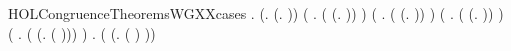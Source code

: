\begin{SaveVerbatim}{HOLCongruenceTheoremsWGXXcases}
\HOLTokenTurnstile{} \HOLSymConst{\HOLTokenForall{}}.
         \HOLSymConst{\HOLTokenEquiv{}}
       (\HOLSymConst{\HOLTokenExists{}}.  \HOLSymConst{=} (\HOLTokenLambda{}. )) \HOLSymConst{\HOLTokenDisj{}}
       (\HOLSymConst{\HOLTokenExists{}} . ( \HOLSymConst{=} (\HOLTokenLambda{}.  )) \HOLSymConst{\HOLTokenConj{}}  ) \HOLSymConst{\HOLTokenDisj{}}
       (\HOLSymConst{\HOLTokenExists{}} . ( \HOLSymConst{=} (\HOLTokenLambda{}.   \HOLSymConst{\ensuremath{+}}  )) \HOLSymConst{\HOLTokenConj{}}   \HOLSymConst{\HOLTokenConj{}}  ) \HOLSymConst{\HOLTokenDisj{}}
       (\HOLSymConst{\HOLTokenExists{}} . ( \HOLSymConst{=} (\HOLTokenLambda{}.   \HOLSymConst{\ensuremath{\parallel}}  )) \HOLSymConst{\HOLTokenConj{}}   \HOLSymConst{\HOLTokenConj{}}  ) \HOLSymConst{\HOLTokenDisj{}}
       (\HOLSymConst{\HOLTokenExists{}} . ( \HOLSymConst{=} (\HOLTokenLambda{}. \HOLConst{\ensuremath{\nu}}  ( ))) \HOLSymConst{\HOLTokenConj{}}  ) \HOLSymConst{\HOLTokenDisj{}}
       \HOLSymConst{\HOLTokenExists{}} . ( \HOLSymConst{=} (\HOLTokenLambda{}.  ( ) )) \HOLSymConst{\HOLTokenConj{}}  
\end{SaveVerbatim}
\newcommand{\HOLCongruenceTheoremsWGXXcases}{\UseVerbatim{HOLCongruenceTheoremsWGXXcases}}
